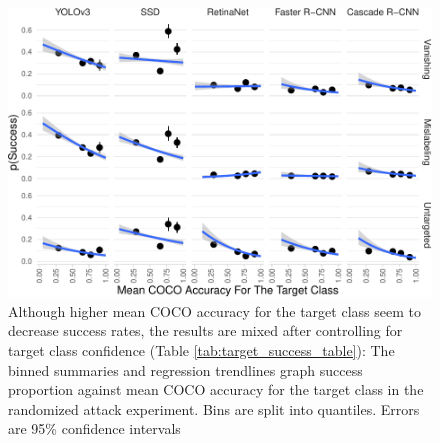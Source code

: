 \documentclass[
]{article}
\begin{document}
\begin{figure}[tb]

{\centering \includegraphics{imgs/target_success_graph-1} 

}

\caption{Although higher mean COCO accuracy for the target class seem to decrease success rates, the results are mixed after controlling for target class confidence (Table \ref{tab:target_success_table}):  The binned summaries and regression trendlines graph success proportion against mean COCO accuracy for the target class in the randomized attack experiment. Bins are split into quantiles. Errors are 95\% confidence intervals}\label{fig:target_success_graph}
\end{figure}

\begingroup\fontsize{9}{11}\selectfont
\end{document}
